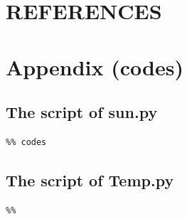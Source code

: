 \documentclass[12pt]{article}
\begin{document}
\newpage
\section*{REFERENCES}
\label{sec:sec6}
\printbibliography[heading=none]

%


\newpage
\section*{Appendix (codes)}
\subsection*{The script of sun.py}

\begin{lstlisting}
%% codes
\end{lstlisting}
\subsection*{The script of Temp.py}
\begin{lstlisting}
%%

\end{lstlisting}
\end{document}
